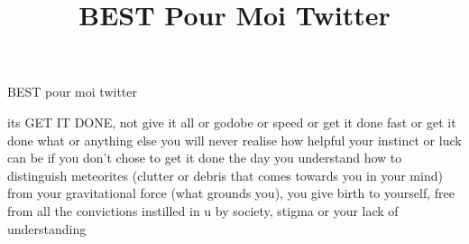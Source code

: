 \documentclass{article}
\title {\Large{\textbf{BEST Pour Moi Twitter}}}
\begin{document}
\maketitle    

BEST pour moi twitter

its GET IT DONE, not give it all or godobe or speed or get it done fast or get it done what or  anything else
you will never realise how helpful your instinct or luck can be if you don't chose to get it done
the day you understand how to distinguish meteorites (clutter or debris that comes towards you in your mind) from your gravitational force (what grounds you), you give birth to yourself, free from all the convictions instilled in u by society, stigma or your lack of understanding
\end{document}

